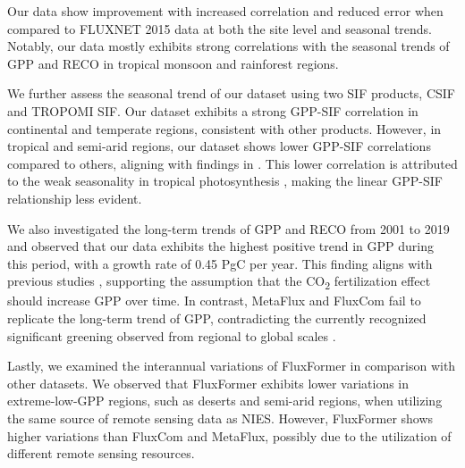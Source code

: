 Our data show improvement with increased correlation and reduced error when compared to FLUXNET 2015 data at both the site level and seasonal trends. Notably, our data mostly exhibits strong correlations with the seasonal trends of GPP and RECO in tropical monsoon and rainforest regions. \par

We further assess the seasonal trend of our dataset using two SIF products, CSIF and TROPOMI SIF. Our dataset exhibits a strong GPP-SIF correlation in continental and temperate regions, consistent with other products. However, in tropical and semi-arid regions, our dataset shows lower GPP-SIF correlations compared to others, aligning with findings in \citep{sanders2016spaceborne,doughty2021global,shekhar2022113282}. This lower correlation is attributed to the weak seasonality in tropical photosynthesis \citep{montgomery2001forest}, making the linear GPP-SIF relationship less evident. \par

We also investigated the long-term trends of GPP and RECO from 2001 to 2019 and observed that our data exhibits the highest positive trend in GPP during this period, with a growth rate of 0.45 PgC per year. This finding aligns with previous studies \citep{piao2020characteristics, yang2022divergent, guo2023estimating}, supporting the assumption that the CO\textsubscript{2} fertilization effect should increase GPP over time. In contrast, MetaFlux and FluxCom fail to replicate the long-term trend of GPP, contradicting the currently recognized significant greening observed from regional to global scales \citep{piao2020characteristics}. \par

Lastly, we examined the interannual variations of FluxFormer in comparison with other datasets. We observed that FluxFormer exhibits lower variations in extreme-low-GPP regions, such as deserts and semi-arid regions, when utilizing the same source of remote sensing data as NIES. However, FluxFormer shows higher variations than FluxCom and MetaFlux, possibly due to the utilization of different remote sensing resources. \par